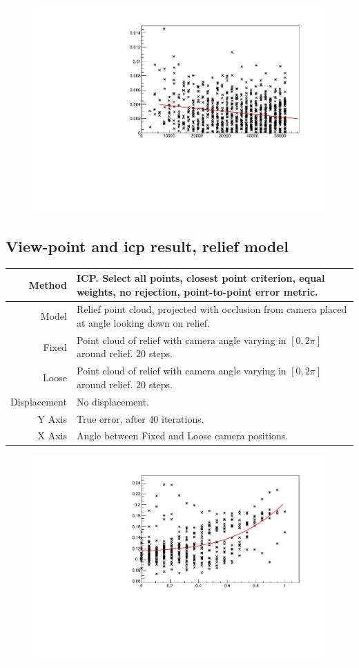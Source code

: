 \begin{figure}[H]
\centering
\includegraphics[width=.7\textwidth]{fig/sphere_icp.pdf}
\end{figure}


\subsection{View-point and \gls{icp} result, relief model} \label{sec:ex_relief_dproj}

\begin{tabularx}{\textwidth}{|r|X|} \hline
Method & ICP. Select all points, closest point criterion, equal weights, no rejection, point-to-point error metric. \\ \hline
Model & Relief point cloud, projected with occlusion from camera placed at angle looking down on relief. \\ \hline
Fixed & Point cloud of relief with camera angle varying in $[0, 2 \pi]$ around relief. $20$ steps. \\ \hline
Loose & Point cloud of relief with camera angle varying in $[0, 2 \pi]$ around relief. $20$ steps. \\ \hline
Displacement & No displacement. \\ \hline
Y Axis & True error, after $40$ iterations. \\\hline
X Axis & Angle between Fixed and Loose camera positions. \\ \hline
\end{tabularx}

\begin{figure}[H]
\centering
\includegraphics[width=.7\textwidth]{fig/relief_dproj.pdf}
\end{figure}


